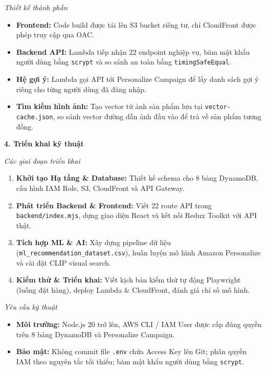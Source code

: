 \emph{Thiết kế thành phần}

\begin{itemize}
\tightlist
\item
  \textbf{Frontend:} Code build được tải lên S3 bucket riêng tư, chỉ
  CloudFront được phép truy cập qua OAC.
\item
  \textbf{Backend API:} Lambda tiếp nhận 22 endpoint nghiệp vụ, băm mật
  khẩu người dùng bằng \texttt{scrypt} và so sánh an toàn bằng
  \texttt{timingSafeEqual}.
\item
  \textbf{Hệ gợi ý:} Lambda gọi API tới Personalize Campaign để lấy danh
  sách gợi ý riêng cho từng người dùng đã đăng nhập.
\item
  \textbf{Tìm kiếm hình ảnh:} Tạo vector từ ảnh sản phẩm lưu tại
  \texttt{vector-cache.json}, so sánh vector đường dẫn ảnh đầu vào để
  trả về sản phẩm tương đồng.
\end{itemize}

\vspace{0.5em}\noindent\textbf{4. Triển khai kỹ
thuật}\par

\emph{Các giai đoạn triển khai}

\begin{enumerate}
\def\labelenumi{\arabic{enumi}.}
\tightlist
\item
  \textbf{Khởi tạo Hạ tầng \& Database:} Thiết kế schema cho 8 bảng
  DynamoDB, cấu hình IAM Role, S3, CloudFront và API Gateway.
\item
  \textbf{Phát triển Backend \& Frontend:} Viết 22 route API trong
  \texttt{backend/index.mjs}, dựng giao diện React và kết nối Redux
  Toolkit với API thật.
\item
  \textbf{Tích hợp ML \& AI:} Xây dựng pipeline dữ liệu
  (\texttt{ml\_recommendation\_dataset.csv}), huấn luyện mô hình Amazon
  Personalize và cài đặt CLIP visual search.
\item
  \textbf{Kiểm thử \& Triển khai:} Viết kịch bản kiểm thử tự động
  Playwright (luồng đặt hàng), deploy Lambda \& CloudFront, đánh giá chỉ
  số mô hình.
\end{enumerate}

\emph{Yêu cầu kỹ thuật}

\begin{itemize}
\tightlist
\item
  \textbf{Môi trường:} Node.js 20 trở lên, AWS CLI / IAM User được cấp
  đúng quyền trên 8 bảng DynamoDB và Personalize Campaign.
\item
  \textbf{Bảo mật:} Không commit file \texttt{.env} chứa Access Key lên
  Git; phân quyền IAM theo nguyên tắc tối thiểu; băm mật khẩu người dùng
  bằng \texttt{scrypt}.
\end{itemize}

